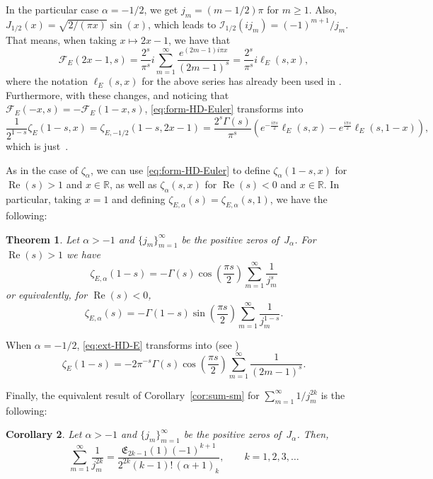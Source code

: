 \documentclass[a4paper]{amsart}
\newcommand{\R}{\mathbb{R}}
\newcommand{\I}{\mathcal{I}}
\newcommand{\E}{\mathfrak{E}}
\renewcommand{\Re}{\operatorname{Re}}
\theoremstyle{plain}
\newtheorem{theorem}{Theorem}[section]
\newtheorem{corollary}[theorem]{Corollary}
\theoremstyle{definition}
\theoremstyle{remark}
\numberwithin{equation}{section}
\begin{document}
In the particular case $\alpha=-1/2$, we get $j_m = (m - 1/2)\pi$ for $m \ge 1$. Also, $J_{1/2}(x) = \sqrt{2/(\pi x)}\sin{(x)}$, which leads to $\I_{1/2}(ij_m) = (-1)^{m+1}/j_m$. That means, when taking $x\mapsto 2x-1$, 
we have that
\[
\mathcal{F}_E(2x-1,s) 
= \frac{2^s}{\pi^s}i\sum_{m=1}^{\infty} \frac{e^{(2m-1)i\pi x}}{(2m - 1)^{s}} 
= \frac{2^s}{\pi^s} i \ell_E(s,x),
\]
where the notation $\ell_E(s,x)$ for the above series has already been  used in \cite[(7.1)]{SuHu}. Furthermore, with these changes, and noticing that $\mathcal{F}_E(-x,s) = -\mathcal{F}_E(1-x,s)$, \eqref{eq:form-HD-Euler} transforms into
\[
\frac{1}{2^{1-s}}\zeta_E(1-s,x) = \zeta_{E,-1/2}(1-s,2x-1) 
= \frac{2^s\Gamma(s)}{\pi^s} 
\left(e^{-\frac{i\pi s}{2}}\ell_E(s,x) - e^{\frac{i\pi s}{2}}\ell_E(s,1-x)\right),
\]
which is just~\cite[(7.2)]{SuHu}. 


As in the case of $\zeta_\alpha$, we can use \eqref{eq:form-HD-Euler} to define $\zeta_\alpha(1-s,x)$ for $\Re(s)>1$ and $x \in \R$, as well as $\zeta_\alpha(s,x)$ for $\Re(s)<0$ and $x \in \R$.
In particular, taking $x=1$ and defining $\zeta_{E,\alpha}(s) = \zeta_{E,\alpha}(s,1)$, we have the following:

\begin{theorem}
\label{teo:ext-HD-E}
Let $\alpha>-1$ and $\{j_m\}_{m=1}^{\infty}$ be the positive zeros of~$J_{\alpha}$.
For $\Re(s) > 1$ we have
\begin{equation}
\label{eq:ext-HD-E}
\zeta_{E,\alpha}(1-s) = -\Gamma(s)\cos{\left(\frac{\pi s}{2}\right)}
\sum_{m=1}^{\infty} \frac{1}{j_m^s}
\end{equation}
or equivalently, for $\Re(s) < 0$, 
\begin{equation*}
\zeta_{E,\alpha}(s) = -\Gamma(1-s)\sin{\left(\frac{\pi s}{2}\right)}
\sum_{m=1}^{\infty} \frac{1}{j_m^{1-s}}.
\end{equation*}
\end{theorem}

When $\alpha=-1/2$, \eqref{eq:ext-HD-E} transforms into (see \cite[(7.4)]{SuHu})
\[
\zeta_{E}(1-s) 
= -2\pi^{-s}\Gamma(s)\cos{\left(\frac{\pi s}{2}\right)}
\sum_{m=1}^{\infty}\frac{1}{(2m-1)^s}.
\]

Finally, the equivalent result of Corollary~\ref{cor:sum-sm} for $\sum_{m=1}^{\infty} 1/j_m^{2k}$ is the following:

\begin{corollary}
Let $\alpha>-1$ and $\{j_m\}_{m=1}^{\infty}$ be the positive zeros of~$J_\alpha$. 
Then,
\begin{equation*}
\sum_{m=1}^{\infty} \frac{1}{j_m^{2k}} 
= \frac{\E_{2k-1}(1)(-1)^{k+1}}{2^{2k}(k-1)!\,(\alpha+1)_{k}},
\qquad k=1,2,3,\dots
\end{equation*}
\end{corollary}
\end{document}

